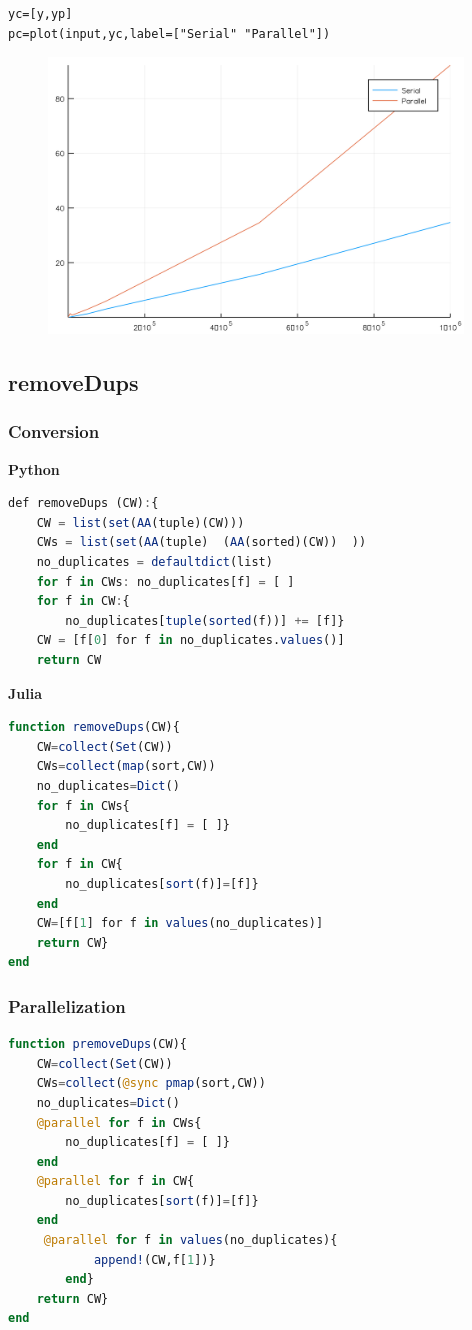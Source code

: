 \documentclass[a4paper,12pt]{article}
\begin{document}
\begin{verbatim}
yc=[y,yp]
pc=plot(input,yc,label=["Serial" "Parallel"])
\end{verbatim}
\begin{figure}[ht!]
\centering
\includegraphics[width=11cm,scale=0.5]{compembedstruct.png}
\end{figure}
\newpage
\subsection{removeDups}
\subsubsection{Conversion}
\textbf{Python}
\begin{lstlisting}[language=Julia,format=Julia]
def removeDups (CW):{
    CW = list(set(AA(tuple)(CW)))
    CWs = list(set(AA(tuple)  (AA(sorted)(CW))  ))
    no_duplicates = defaultdict(list)
    for f in CWs: no_duplicates[f] = [ ]
    for f in CW:{
        no_duplicates[tuple(sorted(f))] += [f]}
    CW = [f[0] for f in no_duplicates.values()]
    return CW
\end{lstlisting}
\textbf{Julia}
\begin{lstlisting}[language=Julia,format=Julia]
function removeDups(CW){
	CW=collect(Set(CW))
	CWs=collect(map(sort,CW))
	no_duplicates=Dict()
	for f in CWs{
		no_duplicates[f] = [ ]}
	end	
	for f in CW{
		no_duplicates[sort(f)]=[f]}
	end	
	CW=[f[1] for f in values(no_duplicates)]
	return CW}
end 
\end{lstlisting}
\subsubsection{Parallelization}
\begin{lstlisting}[language=Julia,format=Julia]
function premoveDups(CW){
	CW=collect(Set(CW))
	CWs=collect(@sync pmap(sort,CW))
	no_duplicates=Dict()
	@parallel for f in CWs{
		no_duplicates[f] = [ ]}
	end
	@parallel for f in CW{
		no_duplicates[sort(f)]=[f]}
	end
	 @parallel for f in values(no_duplicates){
			append!(CW,f[1])}
		end}
	return CW}
end
\end{lstlisting}
\end{document}
